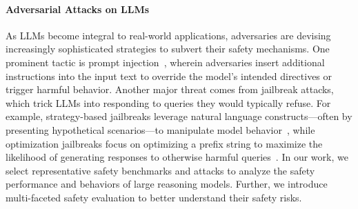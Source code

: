 \paragraph{Adversarial Attacks on LLMs} 
As LLMs become integral to real-world applications, adversaries are devising increasingly sophisticated strategies to subvert their safety mechanisms. 
One prominent tactic is prompt injection~\cite{yi2023benchmarking,zhan2024injecagent,zhang2024agent}, wherein adversaries insert additional instructions into the input text to override the model’s intended directives or trigger harmful behavior. 
Another major threat comes from jailbreak attacks, which trick LLMs into responding to queries they would typically refuse. For example, strategy-based jailbreaks leverage natural language constructs—often by presenting hypothetical scenarios—to manipulate model behavior~\cite{wei2024jailbroken,jiang2024wildteaming,zhu2024autodan,li2024llm,liu2024autodan}, while optimization jailbreaks focus on optimizing a prefix string to maximize the likelihood of generating responses to otherwise harmful queries~\cite{zou2023universal,liao2024amplegcg}.
In our work, we select representative safety benchmarks and attacks to analyze the safety performance and behaviors of large reasoning models. Further, we introduce multi-faceted safety evaluation to better understand their safety risks.